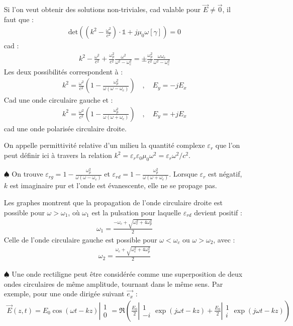 \documentclass{report}
\newcommand*{\vect}[2]{
	\ensuremath{
    \left\lvert 
      \begin{matrix} 
        #1\\ 
        #2 
      \end{matrix}  
    \right.
  }}
\begin{document}
\begin{itemize}
Si l'on veut obtenir des solutions non-triviales, cad valable pour $\vec{E}\neq\vec{0}$, il faut que :
\begin{align*}
\mathrm{det}\left( \left( k^2-\frac{\omega^2}{c^2}\right)\cdot\mathbb{1} +j\mu_0\omega\left[ \gamma\right] \right)=0
\end{align*}
 cad :
 \begin{align*}
	 k^2-\frac{\omega^2}{c^2}+\frac{\omega_p^2}{c^2}\frac{\omega^2}{\omega^2-\omega_c^2}=\pm\frac{\omega_p^2}{c^2}\frac{\omega\omega_c}{\omega^2-\omega_c^2}
 \end{align*}
 Les deux possibilités correspondent à :
 \begin{align*}
 k^2=\frac{\omega^2}{c^2}\left(1-\frac{\omega_p^2}{\omega(\omega-\omega_c)} \right)\quad,\quad E_y=-jE_x
 \end{align*}
 Cad une onde circulaire gauche et :
  \begin{align*}
 k^2=\frac{\omega^2}{c^2}\left(1-\frac{\omega_p^2}{\omega(\omega+\omega_c)} \right)\quad,\quad E_y=+jE_x
 \end{align*}
 cad une onde polarisée circulaire droite. 

On appelle permittivité relative d'un milieu la quantité complexe $\varepsilon_r$ que l'on peut définir ici à travers la relation $k^2=\varepsilon_r\varepsilon_0\mu_0\omega^2=\varepsilon_r\omega^2/c^2$. 

	\item[$\spadesuit$] On trouve $\varepsilon_{rg} = 1-\frac{\omega_p^2}{\omega(\omega-\omega_c)}$ et $\varepsilon_{rd}=1-\frac{\omega_p^2}{\omega(\omega+\omega_c)}$. Lorsque $\varepsilon_r$ est négatif, $k$ est imaginaire pur et l'onde est évanescente, elle ne se propage pas. 
	
	Les graphes montrent que la propagation de l'onde circulaire droite est possible pour $\omega>\omega_1$, où $\omega_1$ est la pulsation pour laquelle $\varepsilon_{rd}$ devient positif :
	\begin{align*}
		\omega_1=\frac{-\omega_c+\sqrt{\omega_c^2+4\omega_p^2}}{2}
	\end{align*}
Celle de l'onde circulaire gauche est possible pour $\omega<\omega_c$ ou $\omega>\omega_2$, avec :
	\begin{align*}
		\omega_2=\frac{\omega_c+\sqrt{\omega_c^2+4\omega_p^2}}{2}
	\end{align*}
	
	\item[$\spadesuit$] Une onde rectiligne peut être considérée comme une superposition de deux ondes circulaires de même amplitude, tournant dans le même sens. Par exemple, pour une onde dirigée suivant $\vec{e_x}$ :
	\begin{align*}
		\vec{E}(z,t) = E_0\cos(\omega t-kz)\vect{1}{0}=\Re\left(\frac{E_0}{2}\vect{1}{-i}\exp (j\omega t-kz) + \frac{E_0}{2}\vect{1}{i}\exp (j\omega t-kz) \right) 
	\end{align*}
	

\end{itemize}
\end{document}
